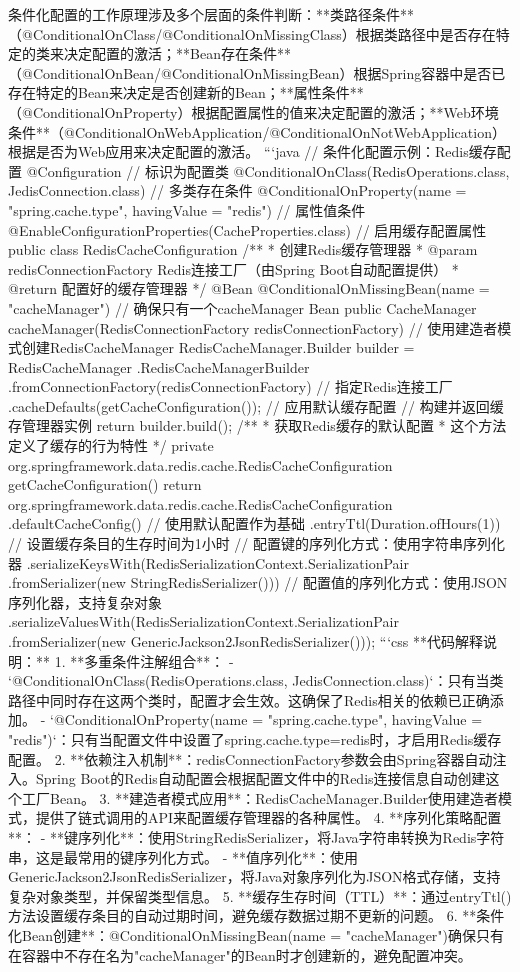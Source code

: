 {{条件化配置的工作原理涉及多个层面的条件判断：**类路径条件**（@ConditionalOnClass/@ConditionalOnMissingClass）根据类路径中是否存在特定的类来决定配置的激活；**Bean存在条件**（@ConditionalOnBean/@ConditionalOnMissingBean）根据Spring容器中是否已存在特定的Bean来决定是否创建新的Bean；**属性条件**（@ConditionalOnProperty）根据配置属性的值来决定配置的激活；**Web环境条件**（@ConditionalOnWebApplication/@ConditionalOnNotWebApplication）根据是否为Web应用来决定配置的激活。 ```java // 条件化配置示例：Redis缓存配置 @Configuration // 标识为配置类 @ConditionalOnClass({RedisOperations.class, JedisConnection.class}) // 多类存在条件 @ConditionalOnProperty(name = "spring.cache.type", havingValue = "redis") // 属性值条件 @EnableConfigurationProperties(CacheProperties.class) // 启用缓存配置属性 public class RedisCacheConfiguration { /** * 创建Redis缓存管理器 * @param redisConnectionFactory Redis连接工厂（由Spring Boot自动配置提供） * @return 配置好的缓存管理器 */ @Bean @ConditionalOnMissingBean(name = "cacheManager") // 确保只有一个cacheManager Bean public CacheManager cacheManager(RedisConnectionFactory redisConnectionFactory) { // 使用建造者模式创建RedisCacheManager RedisCacheManager.Builder builder = RedisCacheManager .RedisCacheManagerBuilder .fromConnectionFactory(redisConnectionFactory) // 指定Redis连接工厂 .cacheDefaults(getCacheConfiguration()); // 应用默认缓存配置 // 构建并返回缓存管理器实例 return builder.build(); } /** * 获取Redis缓存的默认配置 * 这个方法定义了缓存的行为特性 */ private org.springframework.data.redis.cache.RedisCacheConfiguration getCacheConfiguration() { return org.springframework.data.redis.cache.RedisCacheConfiguration .defaultCacheConfig() // 使用默认配置作为基础 .entryTtl(Duration.ofHours(1)) // 设置缓存条目的生存时间为1小时 // 配置键的序列化方式：使用字符串序列化器 .serializeKeysWith(RedisSerializationContext.SerializationPair .fromSerializer(new StringRedisSerializer())) // 配置值的序列化方式：使用JSON序列化器，支持复杂对象 .serializeValuesWith(RedisSerializationContext.SerializationPair .fromSerializer(new GenericJackson2JsonRedisSerializer())); } } ```css **代码解释说明：** 1. **多重条件注解组合**： - `@ConditionalOnClass({RedisOperations.class, JedisConnection.class})`：只有当类路径中同时存在这两个类时，配置才会生效。这确保了Redis相关的依赖已正确添加。 - `@ConditionalOnProperty(name = "spring.cache.type", havingValue = "redis")`：只有当配置文件中设置了spring.cache.type=redis时，才启用Redis缓存配置。 2. **依赖注入机制**：redisConnectionFactory参数会由Spring容器自动注入。Spring Boot的Redis自动配置会根据配置文件中的Redis连接信息自动创建这个工厂Bean。 3. **建造者模式应用**：RedisCacheManager.Builder使用建造者模式，提供了链式调用的API来配置缓存管理器的各种属性。 4. **序列化策略配置**： - **键序列化**：使用StringRedisSerializer，将Java字符串转换为Redis字符串，这是最常用的键序列化方式。 - **值序列化**：使用GenericJackson2JsonRedisSerializer，将Java对象序列化为JSON格式存储，支持复杂对象类型，并保留类型信息。 5. **缓存生存时间（TTL）**：通过entryTtl()方法设置缓存条目的自动过期时间，避免缓存数据过期不更新的问题。 6. **条件化Bean创建**：@ConditionalOnMissingBean(name = "cacheManager")确保只有在容器中不存在名为"cacheManager"的Bean时才创建新的，避免配置冲突。 }}
